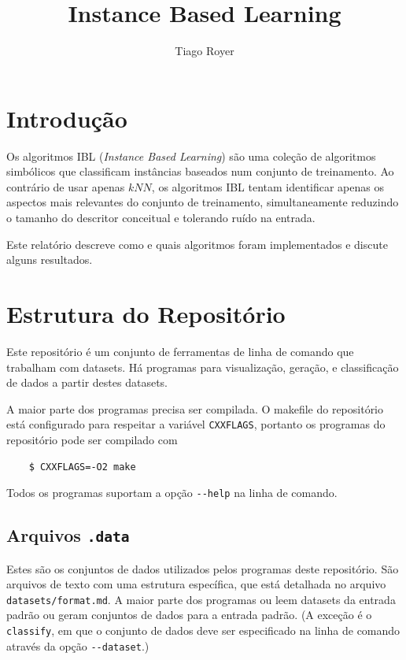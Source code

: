 \documentclass{article}
\author{Tiago Royer}
\title{Instance Based Learning}
\newcommand{\kNN}{k\mathit{NN}}
\begin{document}
\maketitle

\section{Introdução}

Os algoritmos IBL (\emph{Instance Based Learning})
são uma coleção de algoritmos simbólicos
que classificam instâncias baseados num conjunto de treinamento.
Ao contrário de usar apenas $\kNN$,
os algoritmos IBL tentam identificar apenas os aspectos mais relevantes
do conjunto de treinamento,
simultaneamente reduzindo o tamanho do descritor conceitual
e tolerando ruído na entrada.

Este relatório descreve como e quais algoritmos foram implementados
e discute alguns resultados.

\section{Estrutura do Repositório}

Este repositório é um conjunto de ferramentas de linha de comando
que trabalham com datasets. Há programas para visualização,
geração, e classificação de dados a partir destes datasets.

A maior parte dos programas precisa ser compilada.
O makefile do repositório está configurado
para respeitar a variável \texttt{CXXFLAGS},
portanto os programas do repositório pode ser compilado com
\begin{verbatim}
    $ CXXFLAGS=-O2 make
\end{verbatim}

Todos os programas suportam a opção \verb|--help| na linha de comando.

\subsection{Arquivos \texttt{.data}}

Estes são os conjuntos de dados utilizados pelos programas deste repositório.
São arquivos de texto com uma estrutura específica,
que está detalhada no arquivo \verb|datasets/format.md|.
A maior parte dos programas ou leem datasets da entrada padrão
ou geram conjuntos de dados para a entrada padrão.
(A exceção é o \verb|classify|, em que o conjunto de dados
deve ser especificado na linha de comando através da opção \verb|--dataset|.)
\end{document}
